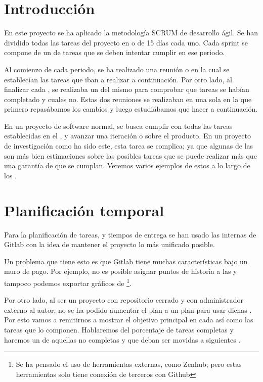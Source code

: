
\section{Introducción}

En este proyecto se ha aplicado la metodología SCRUM de desarrollo ágil. Se han dividido todas las tareas del proyecto en  o  de 15 días cada uno. Cada sprint se compone de un  de tareas que se deben intentar cumplir en ese periodo.

Al comienzo de cada periodo, se ha realizado una reunión o  en la cual se establecían las tareas que iban a realizar a continuación. Por otro lado, al finalizar cada , se realizaba un  del mismo para comprobar que tareas se habían completado y cuales no. Estas dos reuniones se realizaban en una sola en la que primero repasábamos los cambios y luego estudiábamos que hacer a continuación.

En un proyecto de software normal, se busca cumplir con todas las tareas establecidas en el , y avanzar una iteración o  sobre el producto. En un proyecto de investigación como ha sido este, esta tarea se complica; ya que algunas de las  son más bien estimaciones sobre las posibles tareas que se puede realizar más que una garantía de que se cumplan. Veremos varios ejemplos de estos a lo largo de los .


\section{Planificación temporal}

Para la planificación de tareas,  y tiempos de entrega se han usado las  internas de Gitlab con la idea de mantener el proyecto lo más unificado posible.

Un problema que tiene esto es que Gitlab tiene muchas características bajo un muro de pago. Por ejemplo, no es posible asignar puntos de historia a las  y tampoco podemos exportar gráficos de \footnote{Se ha pensado el uso de herramientas externas, como Zenhub; pero estas herramientas solo tiene conexión de terceros con Github}.

Por otro lado, al ser un proyecto con repositorio cerrado y con administrador externo al autor, no se ha podido aumentar el plan a un plan  para usar dichas . Por esto vamos a remitirnos a mostrar el objetivo principal en cada  así como las tareas que lo componen. Hablaremos del porcentaje de tareas completas y haremos un  de aquellas no completas y que deban ser movidas a siguientes .

